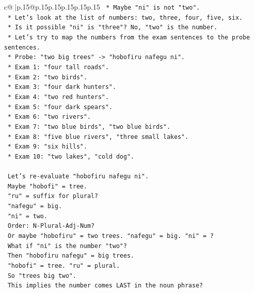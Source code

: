 \documentclass{article}
\begin{document}
{\begin{supertabular}{c@{$\;$}|p{.15\linewidth}@{}p{.15\linewidth}p{.15\linewidth}p{.15\linewidth}p{.15\linewidth}p{.15\linewidth}}
{{{\texttt{        *   Maybe "ni" is not "two".} \\
\texttt{        *   Let's look at the list of numbers: two, three, four, five, six.} \\
\texttt{        *   Is it possible "ni" is "three"? No, "two" is the number.} \\
\texttt{        *   Let's try to map the numbers from the exam sentences to the probe sentences.} \\
\texttt{        *   Probe: "two big trees" {-}> "hobofiru nafegu ni".} \\
\texttt{        *   Exam 1: "four tall roads".} \\
\texttt{        *   Exam 2: "two birds".} \\
\texttt{        *   Exam 3: "four dark hunters".} \\
\texttt{        *   Exam 4: "two red hunters".} \\
\texttt{        *   Exam 5: "four dark spears".} \\
\texttt{        *   Exam 6: "two rivers".} \\
\texttt{        *   Exam 7: "two blue birds", "two blue birds".} \\
\texttt{        *   Exam 8: "five blue rivers", "three small lakes".} \\
\texttt{        *   Exam 9: "six hills".} \\
\texttt{        *   Exam 10: "two lakes", "cold dog".} \\
\\ 
\texttt{        Let's re{-}evaluate "hobofiru nafegu ni".} \\
\texttt{        Maybe "hobofi" = tree.} \\
\texttt{        "ru" = suffix for plural?} \\
\texttt{        "nafegu" = big.} \\
\texttt{        "ni" = two.} \\
\texttt{        Order: N{-}Plural{-}Adj{-}Num?} \\
\texttt{        Or maybe "hobofiru" = two trees. "nafegu" = big. "ni" = ?} \\
\texttt{        What if "ni" is the number "two"?} \\
\texttt{        Then "hobofiru nafegu" = big trees.} \\
\texttt{        "hobofi" = tree. "ru" = plural.} \\
\texttt{        So "trees big two".} \\
\texttt{        This implies the number comes LAST in the noun phrase?} \\
}}}
\end{supertabular}}
\end{document}
